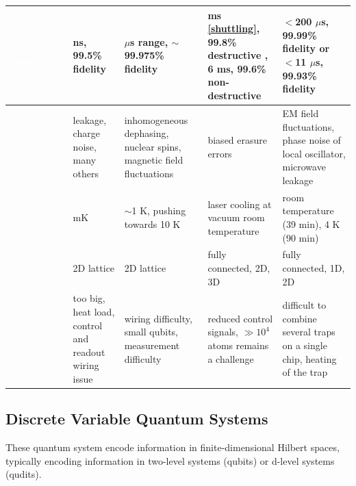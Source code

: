 \begin{table}[h]
\begin{center}
\begin{tabular}{|>{\centering\arraybackslash}m{2cm}|>{\centering\arraybackslash}m{3.5cm}|>{\centering\arraybackslash}m{3.5cm}|>{\centering\arraybackslash}m{3.5cm}|>{\centering\arraybackslash}m{3.5cm}|}
         \rowcolor[HTML]{d9dbe2} \cellcolor[HTML]{2f7790} \textcolor{white}{readout time}& 140 ns, 99.5\% fidelity\cite{Chen_2023} & $\mu$s range, $\sim$99.975\% fidelity \cite{Stano_2022}& 1 ms \cref{shuttling}, 99.8\% destructive \cite{Bluvstein2024}, 6 ms, 99.6\% non-destructive \cite{radnaev2024universalneutralatomquantumcomputer}& $<$200 $ \mu$s, 99.99\% fidelity \cite{myerson2008high}
or
$<$11 $\mu$s, 99.93\% fidelity \cite{crain2019high}\\ \hline
         \rowcolor[HTML]{b6bac4} \cellcolor[HTML]{2f7790} \textcolor{white}{noise type}&  leakage, charge noise, many others\cite{krantz_quantum_2019}& inhomogeneous dephasing, nuclear spins, magnetic field fluctuations \cite{Sun_2024} & biased erasure errors \cite{Sahay_2023}& EM field fluctuations, phase noise of local oscillator, microwave leakage \cite{wang2021single} \\ \hline
         \rowcolor[HTML]{d9dbe2} \cellcolor[HTML]{2f7790} \textcolor{white}{working temperature}&  250 mK\cite{anferov2024superconductingqubits20ghz} & $\sim$1 K, pushing towards 10 K \cite{Ono_2019} & laser cooling at vacuum room temperature \cite{Wintersperger2023}& room temperature (39 min), 4 K (90 min) \cite{wang2021single} \\ \hline
         \rowcolor[HTML]{b6bac4} \cellcolor[HTML]{2f7790} \textcolor{white}{connectivity}& 2D lattice\cite{IBMQuantum} & 2D lattice & fully connected, 2D, 3D \cite{Bluvstein2024}& fully connected, 1D, 2D \cite{valentini2024demonstration} \\ \hline
         \rowcolor[HTML]{d9dbe2} \cellcolor[HTML]{2f7790} \textcolor{white}{scalability}&  too big, heat load, control and readout wiring issue& wiring difficulty, small qubits, measurement difficulty& reduced control signals, $\gg 10^4$ atoms remains a challenge  \cite{sunami2024scalablenetworkingneutralatomqubits} & difficult to combine several traps on a single chip, heating of the trap \cite{large2024ion} \\ \hline
         
    \end{tabular}
    \end{center}
    
\end{table}
\subsection{Discrete Variable Quantum Systems}
These quantum system encode information in finite-dimensional Hilbert spaces, typically encoding information in two-level systems (qubits) or d-level systems (qudits).